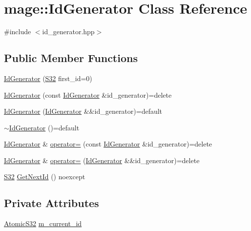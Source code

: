 \hypertarget{classmage_1_1_id_generator}{}\section{mage\+:\+:Id\+Generator Class Reference}
\label{classmage_1_1_id_generator}


{\ttfamily \#include $<$id\+\_\+generator.\+hpp$>$}

\subsection*{Public Member Functions}
\begin{DoxyCompactItemize}
\item 
\hyperlink{classmage_1_1_id_generator_a59392d3cbba77c323c467fffb539f630}{Id\+Generator} (\hyperlink{namespacemage_a642e05c5c83642b6946703615cdbf2da}{S32} first\+\_\+id=0)
\item 
\hyperlink{classmage_1_1_id_generator_a6f502d2cd8b63e7c76f31834b028a11d}{Id\+Generator} (const \hyperlink{classmage_1_1_id_generator}{Id\+Generator} \&id\+\_\+generator)=delete
\item 
\hyperlink{classmage_1_1_id_generator_a0ee69053c6cdb9f79a5857e65ebd2b6a}{Id\+Generator} (\hyperlink{classmage_1_1_id_generator}{Id\+Generator} \&\&id\+\_\+generator)=default
\item 
\hyperlink{classmage_1_1_id_generator_a70161ab5b10294ebba1ace7a3b0f8d31}{$\sim$\+Id\+Generator} ()=default
\item 
\hyperlink{classmage_1_1_id_generator}{Id\+Generator} \& \hyperlink{classmage_1_1_id_generator_a370c8289f38a534006e8b9ca7ec78026}{operator=} (const \hyperlink{classmage_1_1_id_generator}{Id\+Generator} \&id\+\_\+generator)=delete
\item 
\hyperlink{classmage_1_1_id_generator}{Id\+Generator} \& \hyperlink{classmage_1_1_id_generator_aace8082947445d26d2421ba8b361f1bc}{operator=} (\hyperlink{classmage_1_1_id_generator}{Id\+Generator} \&\&id\+\_\+generator)=delete
\item 
\hyperlink{namespacemage_a642e05c5c83642b6946703615cdbf2da}{S32} \hyperlink{classmage_1_1_id_generator_a9e0e86e5feab919f5ac5ab4ad8f51b09}{Get\+Next\+Id} () noexcept
\end{DoxyCompactItemize}
\subsection*{Private Attributes}
\begin{DoxyCompactItemize}
\item 
\hyperlink{namespacemage_a34972c09c02b691cd7cc5ea34db1e778}{Atomic\+S32} \hyperlink{classmage_1_1_id_generator_af834ccd6b694775f434949a1c1382965}{m\+\_\+current\+\_\+id}
\end{DoxyCompactItemize}


